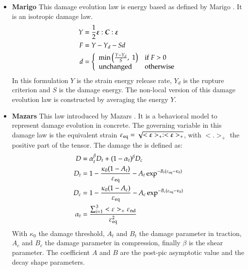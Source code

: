 \begin{itemize}
\item \textbf{Marigo}
This damage evolution law is energy based as defined by Marigo \cite{marigo81a,
  lemaitre96a}. It is an isotropic damage law.
\begin{align}
  Y &= \frac{1}{2}\boldsymbol{\varepsilon}:\boldsymbol{C}:\boldsymbol{\varepsilon}\\
  F &= Y - Y_d - S d\\
  d &= \left\{
    \begin{array}{l l}
      \mathrm{min}\left(\frac{Y-Y_d}{S},\;1\right) & \mathrm{if}\; F > 0\\
      \mathrm{unchanged} & \mathrm{otherwise}
    \end{array}
  \right.
\end{align}
In this formulation $Y$ is the strain  energy release rate, $Y_d$ is the rupture
criterion and  $S$ is the damage  energy.  The non-local version  of this damage
evolution law is constructed by averaging the energy $Y$.
\item \textbf{Mazars}
This law introduced by Mazars \cite{mazars84a}. It is a behavioral model to
represent damage evolution in concrete. The governing variable in this damage
law is the equivalent strain $\varepsilon_{{\mathrm{eq}}} =
\sqrt{<\boldsymbol{\varepsilon}>_+:<\boldsymbol{\varepsilon}>_+}$, with $<.>_+$ the positive
part of the tensor.
The damage the is defined as:
\begin{align}
  D &= \alpha_t^\beta D_t + (1-\alpha_t)^\beta D_c\\
  D_t &= 1 - \frac{\kappa_0 (1- A_t)}{\varepsilon_{{\mathrm{eq}}}} - A_t \exp^{-B_t(\varepsilon_{{\mathrm{eq}}}-\kappa_0)}\\
  D_c &= 1 - \frac{\kappa_0 (1- A_c)}{\varepsilon_{{\mathrm{eq}}}} - A_c
  \exp^{-B_c(\varepsilon_{{\mathrm{eq}}}-\kappa_0)}\\
  \alpha_t &= \frac{\sum_{i=1}^3<\varepsilon>_+\varepsilon_{{\mathrm{nd}}}}{\varepsilon_{{\mathrm{eq}}}^2}
\end{align}
With $\kappa_0$ the damage threshold, $A_t$ and $B_t$ the damage parameter in
traction, $A_c$ and $B_c$ the damage parameter in compression, finally $\beta$
is the shear parameter. The coefficient $A$ and $B$ are the post-pic asymptotic
value and the decay shape parameters.
\end{itemize}

